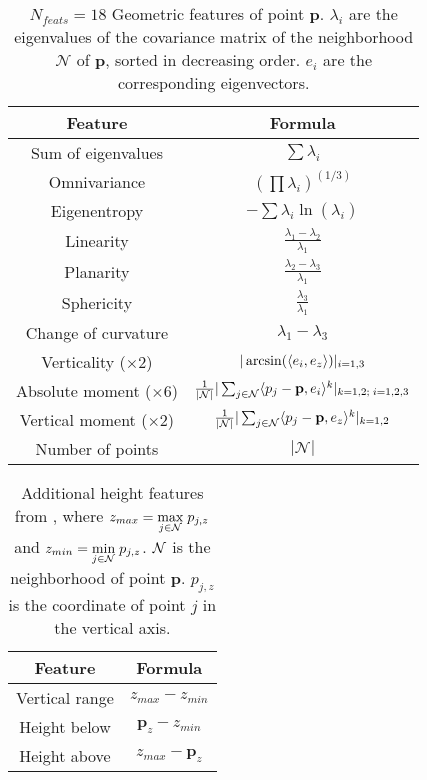 \documentclass{article}
\begin{document}
\begin{table}[H]
    \centering
    \begin{tabular}{|c||c|}
    \hline
    \textbf{Feature} & \textbf{Formula} \\
    \hline   
    Sum of eigenvalues & $\sum \lambda_i$ \\[1ex]
    Omnivariance & $(\prod \lambda_i)^{(1/3)}$\\[1ex]
    Eigenentropy & $-\sum \lambda_i \ln(\lambda_i)$\\[1ex]
    Linearity & $\frac{\lambda_1 - \lambda_2}{\lambda_1}$\\[1ex]
    Planarity & $\frac{\lambda_2 - \lambda_3}{\lambda_1}$\\[1ex]
    Sphericity & $\frac{\lambda_3}{\lambda_1}$\\[1ex]
    Change of curvature & $\lambda_1 - \lambda_3$\\[1ex]
    Verticality ($\times2$) & $|\arcsin(\langle e_i, e_z \rangle)|_{i=1, 3}$ \\[1ex]
    Absolute moment ($\times6$) & $\frac{1}{|\mathcal{N}|}|\sum_{j\in\mathcal{N}} \langle p_j - \mathbf{p}, e_i \rangle^k|_{k = 1, 2;\; i = 1, 2, 3}$\\[1ex]
    Vertical moment ($\times2$) & $\frac{1}{|\mathcal{N}|}|\sum_{j\in\mathcal{N}} \langle p_j - \mathbf{p}, e_z \rangle^k|_{k=1, 2}$ \\[1ex]
    Number of points & $|\mathcal{N}|$\\[1ex]
    \hline
    \end{tabular}
    \caption{$N_{feats}=18$ Geometric features \cite{thomas_semantic_2018} of point $\mathbf{p}$. $\lambda_i$ are the eigenvalues of the covariance matrix of the neighborhood $\mathcal{N}$ of $\mathbf{p}$, sorted in decreasing order. $e_i$ are the corresponding eigenvectors.}
    \label{tab:thomas_feat}
\end{table}

\begin{table}[H]
    \centering
    \begin{tabular}{|c||c|}
        \hline
    \textbf{Feature} & \textbf{Formula} \\
        \hline
        Vertical range & $z_{max} - z_{min} $\\[1ex]
        Height below & $\mathbf{p}_z - z_{min} $ \\[1ex]
        Height above & $z_{max} - \mathbf{p}_z$\\[1ex]
        \hline
    \end{tabular}

    \caption{Additional height features from \cite{hackel_fast_nodate, mohamed_improvement_2022}, where $z_{max} = \underset{j\in\mathcal{N}}{\max}\;p_{j,z}$ and $z_{min} = \underset{j\in\mathcal{N}}{\min}\; p_{j,z}$. $\mathcal{N}$ is the neighborhood of point $\mathbf{p}$. $p_{j,z}$ is the coordinate of point $j$ in the vertical axis.}
    \label{tab:height_feat}
\end{table}
\end{document}
